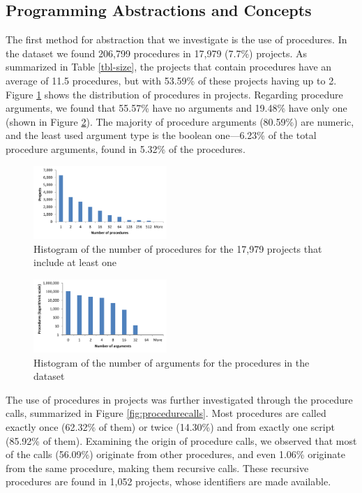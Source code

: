 \documentclass{sig-alternate}
\begin{document}
\subsection{Programming Abstractions and Concepts}
\label{RQ2}
The first method for abstraction that we investigate is the use of procedures. In the dataset we found 206,799 procedures in 17,979 (7.7\%) projects. As summarized in Table \ref{tbl-size}, the projects that contain procedures have an average of 11.5 procedures, but with 53.59\% of these projects having up to 2. Figure \ref{fig:proceduresperproject} shows the distribution of procedures in projects. Regarding procedure arguments, we found that 55.57\% have no arguments and 19.48\% have only one (shown in Figure \ref{fig:procedurearguments}). The majority of procedure arguments (80.59\%) are numeric, and the least used argument type is the boolean one---6.23\% of the total procedure arguments, found in 5.32\% of the procedures.

\begin{figure}
	\centering
	\includegraphics[width=0.45\textwidth]{fig/charts/6proceduresperproject}
	\caption{Histogram of the number of procedures for the 17,979 projects that include at least one}
	\label{fig:proceduresperproject}
\end{figure}

\begin{figure}
	\centering
	\includegraphics[width=0.45\textwidth]{fig/charts/5arguments}
	\caption{Histogram of the number of arguments for the procedures in the dataset}
	\label{fig:procedurearguments}
\end{figure}

The use of procedures in projects was further investigated through the procedure calls, summarized in Figure \ref{fig:procedurecalls}. Most procedures are called exactly once (62.32\% of them) or twice (14.30\%) and from exactly one script (85.92\% of them). Examining the origin of procedure calls, we observed that most of the calls (56.09\%) originate from other procedures, and even 1.06\% originate from the same procedure, making them recursive calls. These recursive procedures are found in 1,052 projects, whose identifiers are made available.\footnotemark[\ref{repo}]
\end{document}
